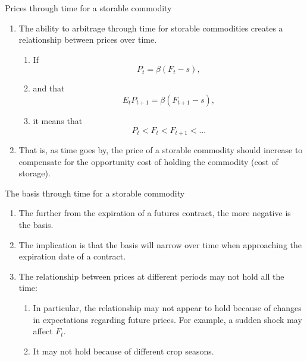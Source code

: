 \documentclass[table,xcolor=pdftex,dvipsnames, handout]{beamer}\usepackage[]{graphicx}\usepackage[]{color}
\begin{document}
\begin{frame}{Prices through time for a storable commodity}
\begin{enumerate}[label=\textbullet]
    \item The ability to arbitrage through time for storable commodities creates a relationship between prices over time.
        \begin{enumerate}[label=-]
          \item If \[  P_t = \beta (F_t - s),\]
            \vspace{-1\baselineskip}
          \item and that \[ E_t P_{t+1} = \beta (F_{t+1} - s), \]
            \vspace{-1\baselineskip}
          \item it means that \[ P_t < F_t  < F_{t+1} < ... \]
            \vspace{-1\baselineskip}
        \end{enumerate}
    \item That is, as time goes by, the price of a storable commodity should increase to compensate for the opportunity cost of holding the commodity (cost of storage).
\end{enumerate}
\end{frame}


\begin{frame}{The basis through time for a storable commodity}
\begin{enumerate}[label=\textbullet]
    \item The further from the expiration of a futures contract, the more negative is the basis.
    \item The implication is that the basis will narrow over time when approaching the expiration date of a contract.
    \item The relationship between prices at different periods may not hold all the time:
        \begin{enumerate}[label=-]
          \item In particular, the relationship may not appear to hold because of changes in expectations regarding future prices. For example, a sudden shock may affect $F_t$.
          \item It may not hold because of different crop seasons.
        \end{enumerate}
\end{enumerate}
\end{frame}
\end{document}
